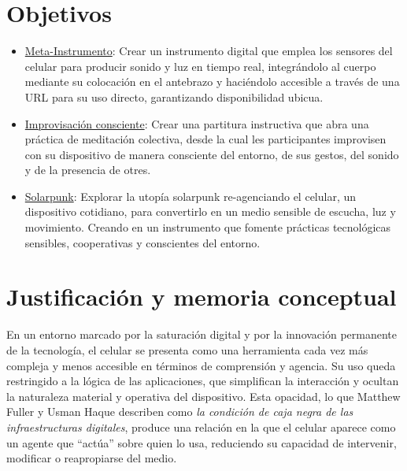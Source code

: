 \documentclass[spanish]{report}
\newcommand{\sectionsep}{1cm}
\begin{document}
\vspace{\sectionsep}
\section{Objetivos}
\begin{itemize}

    \item \underline{Meta-Instrumento}:
    Crear un instrumento digital que emplea los sensores del celular para producir sonido y luz en tiempo real, integrándolo al cuerpo mediante su colocación en el antebrazo y haciéndolo accesible a través de una URL para su uso directo, garantizando disponibilidad ubicua.
    
    \item \underline{Improvisación consciente}:
    Crear una partitura instructiva que abra una práctica de meditación colectiva, desde la cual les participantes improvisen con su dispositivo de manera consciente del entorno, de sus gestos, del sonido y de la presencia de otres.

    \item \underline{Solarpunk}:
    Explorar la utopía solarpunk re-agenciando el celular, un dispositivo cotidiano, para convertirlo en un medio sensible de escucha, luz y movimiento. Creando en un instrumento que fomente prácticas tecnológicas sensibles, cooperativas y conscientes del entorno.

\end{itemize}

\vspace{\sectionsep}
\section{Justificación y memoria conceptual}
En un entorno marcado por la saturación digital y por la innovación permanente de la tecnología, el celular se presenta como una herramienta cada vez más compleja y menos accesible en términos de comprensión y agencia. Su uso queda restringido a la lógica de las aplicaciones, que simplifican la interacción y ocultan la naturaleza material y operativa del dispositivo. Esta opacidad, lo que Matthew Fuller y Usman Haque describen como \textit{la condición de caja negra de las infraestructuras digitales}, produce una relación en la que el celular aparece como un agente que “actúa” sobre quien lo usa, reduciendo su capacidad de intervenir, modificar o reapropiarse del medio.
\end{document}
